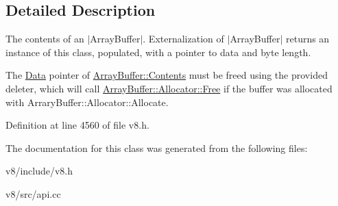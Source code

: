 \subsection{Detailed Description}
The contents of an $\vert$\+Array\+Buffer$\vert$. Externalization of $\vert$\+Array\+Buffer$\vert$ returns an instance of this class, populated, with a pointer to data and byte length.

The \mbox{\hyperlink{classv8_1_1Data}{Data}} pointer of \mbox{\hyperlink{classv8_1_1ArrayBuffer_1_1Contents}{Array\+Buffer\+::\+Contents}} must be freed using the provided deleter, which will call \mbox{\hyperlink{classv8_1_1ArrayBuffer_1_1Allocator_a419f59d2a103a5a8863809d7977c9cd8}{Array\+Buffer\+::\+Allocator\+::\+Free}} if the buffer was allocated with Arrary\+Buffer\+::\+Allocator\+::\+Allocate. 

Definition at line 4560 of file v8.\+h.



The documentation for this class was generated from the following files\+:\begin{DoxyCompactItemize}
\item 
v8/include/v8.\+h\item 
v8/src/api.\+cc\end{DoxyCompactItemize}
